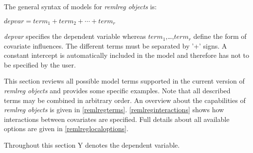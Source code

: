 The general syntax of models for {\em remlreg objects} is:

$depvar = term_1 + term_2 + \cdots + term_r$

{\em depvar} specifies the dependent variable whereas
$term_1$,\dots,$term_r$ define the form of covariate influences.
The different terms must be separated by '+' signs. A constant
intercept is automatically included in the model and therefore has
not to be specified by the user.

This section reviews all possible model terms supported in the
current version of {\em remlreg objects} and provides some
specific examples. Note that all described terms may be combined
in arbitrary order. An overview about the capabilities of {\em
remlreg objects} is given in \autoref{remlregterms}.
\autoref{remlreginteractions} shows how interactions between
covariates are specified. Full details about all available options
are given in \autoref{remlreglocaloptions}.

Throughout this section Y denotes the dependent variable.

